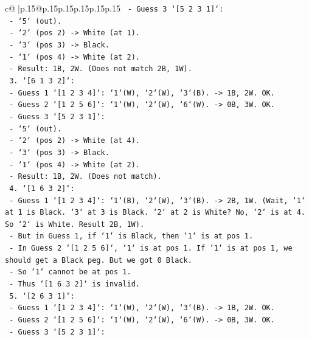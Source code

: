 \documentclass{article}
\begin{document}
{\begin{supertabular}{c@{$\;$}|p{.15\linewidth}@{}p{.15\linewidth}p{.15\linewidth}p{.15\linewidth}p{.15\linewidth}p{.15\linewidth}}
{{{\texttt{     {-} Guess 3 `{[}5 2 3 1{]}`:} \\
\texttt{       {-} `5` (out).} \\
\texttt{       {-} `2` (pos 2) {-}> White (at 1).} \\
\texttt{       {-} `3` (pos 3) {-}> Black.} \\
\texttt{       {-} `1` (pos 4) {-}> White (at 2).} \\
\texttt{       {-} Result: 1B, 2W. (Does not match 2B, 1W).} \\
\texttt{  3. `{[}6 1 3 2{]}`:} \\
\texttt{     {-} Guess 1 `{[}1 2 3 4{]}`: `1`(W), `2`(W), `3`(B). {-}> 1B, 2W. OK.} \\
\texttt{     {-} Guess 2 `{[}1 2 5 6{]}`: `1`(W), `2`(W), `6`(W). {-}> 0B, 3W. OK.} \\
\texttt{     {-} Guess 3 `{[}5 2 3 1{]}`:} \\
\texttt{       {-} `5` (out).} \\
\texttt{       {-} `2` (pos 2) {-}> White (at 4).} \\
\texttt{       {-} `3` (pos 3) {-}> Black.} \\
\texttt{       {-} `1` (pos 4) {-}> White (at 2).} \\
\texttt{       {-} Result: 1B, 2W. (Does not match).} \\
\texttt{  4. `{[}1 6 3 2{]}`:} \\
\texttt{     {-} Guess 1 `{[}1 2 3 4{]}`: `1`(B), `2`(W), `3`(B). {-}> 2B, 1W. (Wait, `1` at 1 is Black. `3` at 3 is Black. `2` at 2 is White? No, `2` is at 4. So `2` is White. Result 2B, 1W).} \\
\texttt{       {-} But in Guess 1, if `1` is Black, then `1` is at pos 1.} \\
\texttt{       {-} In Guess 2 `{[}1 2 5 6{]}`, `1` is at pos 1. If `1` is at pos 1, we should get a Black peg. But we got 0 Black.} \\
\texttt{       {-} So `1` cannot be at pos 1.} \\
\texttt{       {-} Thus `{[}1 6 3 2{]}` is invalid.} \\
\texttt{  5. `{[}2 6 3 1{]}`:} \\
\texttt{     {-} Guess 1 `{[}1 2 3 4{]}`: `1`(W), `2`(W), `3`(B). {-}> 1B, 2W. OK.} \\
\texttt{     {-} Guess 2 `{[}1 2 5 6{]}`: `1`(W), `2`(W), `6`(W). {-}> 0B, 3W. OK.} \\
\texttt{     {-} Guess 3 `{[}5 2 3 1{]}`:} \\
}}}
\end{supertabular}}
\end{document}
